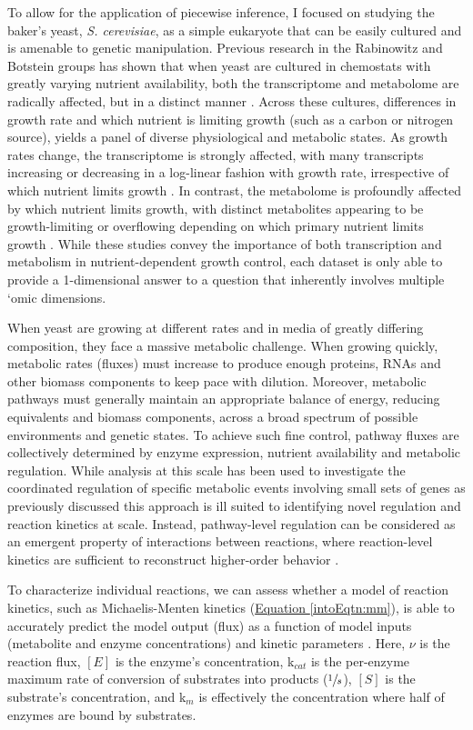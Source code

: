 To allow for the application of piecewise inference, I focused on studying the baker's yeast, \textit{S. cerevisiae}, as a simple eukaryote that can be easily cultured and is amenable to genetic manipulation. Previous research in the Rabinowitz and Botstein groups has shown that when yeast are cultured in chemostats with greatly varying nutrient availability, both the transcriptome and metabolome are radically affected, but in a distinct manner \cite{Brauer:2008jn, Boer:2010fb}. Across these cultures, differences in growth rate and which nutrient is limiting growth (such as a carbon or nitrogen source), yields a panel of diverse physiological and metabolic states. As growth rates change, the transcriptome is strongly affected, with many transcripts increasing or decreasing in a log-linear fashion with growth rate, irrespective of which nutrient limits growth \cite{Brauer:2008jn}. In contrast, the metabolome is profoundly affected by which nutrient limits growth, with distinct metabolites appearing to be growth-limiting or overflowing depending on which primary nutrient limits growth \cite{Boer:2010fb}. While these studies convey the importance of both transcription and metabolism in nutrient-dependent growth control, each dataset is only able to provide a 1-dimensional answer to a question that inherently involves multiple `omic dimensions.

When yeast are growing at different rates and in media of greatly differing composition, they face a massive metabolic challenge. When growing quickly, metabolic rates (fluxes) must increase to produce enough  proteins, RNAs and other biomass components to keep pace with dilution.  Moreover, metabolic pathways must generally maintain an appropriate balance of energy, reducing equivalents and biomass components, across a broad spectrum of possible environments and genetic states. To achieve such fine control, pathway fluxes are collectively determined by enzyme expression, nutrient availability and metabolic regulation.  While analysis at this scale has been used to investigate the coordinated regulation of specific metabolic events involving small sets of genes \cite{Zampar:2013fr, Link:2013dj} as previously discussed this approach is ill suited to identifying novel regulation and reaction kinetics at scale. Instead, pathway-level regulation can be considered as an emergent property of interactions between reactions, where reaction-level kinetics are sufficient to reconstruct higher-order behavior \cite{Fell:1997wg}.

To characterize individual reactions, we can assess whether a model of reaction kinetics, such as Michaelis-Menten kinetics (\hyperref[intoEqtn:mm]{Equation \ref{intoEqtn:mm}}), is able to accurately predict the model output (flux) as a function of model inputs (metabolite and enzyme concentrations) and kinetic parameters \cite{Anonymous:1913wn, Liebermeister:2006fm, Tummler:2014cp}. Here, $\nu$ is the reaction flux, $\left[E\right]$ is the enzyme's concentration, k$_{cat}$ is the per-enzyme maximum rate of conversion of substrates into products ($\sfrac{1}{s}$), $\left[S\right]$ is the substrate's concentration, and k$_{m}$ is effectively the concentration where half of enzymes are bound by substrates.

